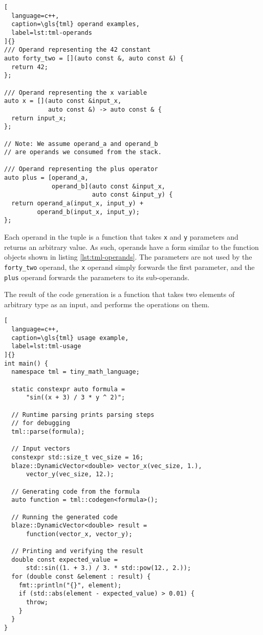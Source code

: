 \documentclass[../main]{subfiles}
\begin{document}
\begin{lstlisting}[
  language=c++,
  caption=\gls{tml} operand examples,
  label=lst:tml-operands
]{}
/// Operand representing the 42 constant
auto forty_two = [](auto const &, auto const &) {
  return 42;
};

/// Operand representing the x variable
auto x = [](auto const &input_x,
            auto const &) -> auto const & {
  return input_x;
};

// Note: We assume operand_a and operand_b
// are operands we consumed from the stack.

/// Operand representing the plus operator
auto plus = [operand_a,
             operand_b](auto const &input_x,
                        auto const &input_y) {
  return operand_a(input_x, input_y) +
         operand_b(input_x, input_y);
};
\end{lstlisting}

Each operand in the tuple is a function that takes \lstinline{x} and
\lstinline{y} parameters and returns an arbitrary value.
As such, operands have a form similar to the function
objects shown in listing \ref{lst:tml-operands}.
The parameters are not used by the \lstinline{forty_two} operand,
the \lstinline{x} operand simply forwards the first parameter,
and the \lstinline{plus} operand forwards the parameters to its sub-operands.

The result of the code generation is a function that takes two elements of
arbitrary type as an input, and performs the operations on them.

\begin{lstlisting}[
  language=c++,
  caption=\gls{tml} usage example,
  label=lst:tml-usage
]{}
int main() {
  namespace tml = tiny_math_language;

  static constexpr auto formula =
      "sin((x + 3) / 3 * y ^ 2)";

  // Runtime parsing prints parsing steps
  // for debugging
  tml::parse(formula);

  // Input vectors
  constexpr std::size_t vec_size = 16;
  blaze::DynamicVector<double> vector_x(vec_size, 1.),
      vector_y(vec_size, 12.);

  // Generating code from the formula
  auto function = tml::codegen<formula>();

  // Running the generated code
  blaze::DynamicVector<double> result =
      function(vector_x, vector_y);

  // Printing and verifying the result
  double const expected_value =
      std::sin((1. + 3.) / 3. * std::pow(12., 2.));
  for (double const &element : result) {
    fmt::println("{}", element);
    if (std::abs(element - expected_value) > 0.01) {
      throw;
    }
  }
}
\end{lstlisting}
\end{document}
